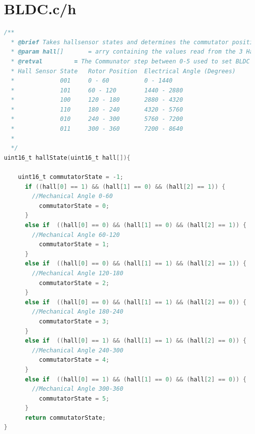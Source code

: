 \documentclass[paper=a4,11pt]{scrreprt}
\begin{document}
\newpage
\section{BLDC.c/h}
\begin{lstlisting}[language=C, caption=\textbf{uint16\_t hallState(uint16\_t hall[])},label={hallS}, mathescape=true, breaklines=true]
/**
  * @brief Takes hallsensor states and determines the commutator position
  * @param hall[] 		= arry containing the values read from the 3 Hall Sensors
  * @retval			= The Communator step between 0-5 used to set BLDC gates
  * Hall Sensor State	Rotor Position	Electrical Angle (Degrees)
  *				001		0 - 60			0 - 1440
  *				101		60 - 120		1440 - 2880
  *				100		120 - 180		2880 - 4320
  *				110		180 - 240		4320 - 5760
  *				010		240 - 300		5760 - 7200
  *				011		300 - 360		7200 - 8640
  *
  */
uint16_t hallState(uint16_t hall[]){

	uint16_t commutatorState = -1;
	  if ((hall[0] == 1) && (hall[1] == 0) && (hall[2] == 1)) {
		//Mechanical Angle 0-60
		  commutatorState = 0;
	  }
	  else if  ((hall[0] == 0) && (hall[1] == 0) && (hall[2] == 1)) {
		//Mechanical Angle 60-120
		  commutatorState = 1;
	  }
	  else if  ((hall[0] == 0) && (hall[1] == 1) && (hall[2] == 1)) {
		//Mechanical Angle 120-180
		  commutatorState = 2;
	  }
	  else if  ((hall[0] == 0) && (hall[1] == 1) && (hall[2] == 0)) {
		//Mechanical Angle 180-240
		  commutatorState = 3;
	  }
	  else if  ((hall[0] == 1) && (hall[1] == 1) && (hall[2] == 0)) {
		//Mechanical Angle 240-300
		  commutatorState = 4;
	  }
	  else if  ((hall[0] == 1) && (hall[1] == 0) && (hall[2] == 0)) {
		//Mechanical Angle 300-360
		  commutatorState = 5;
	  }
	  return commutatorState;
}
\end{lstlisting}
\newpage
\end{document}

